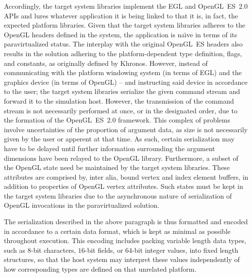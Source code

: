 Accordingly, the target system libraries implement the EGL and OpenGL~ES~$2.0$ APIs and lures whatever application it is being linked to that it is, in fact, the expected platform libraries.
Given that the target system libraries adheres to the OpenGL headers defined in the system, the application is na\"{\i}ve in terms of its paravirtualized status.
The interplay with the original OpenGL~ES headers also results in the solution adhering to the platform-dependent type definition, flags, and constants, as originally defined by Khronos.
However, instead of communicating with the platform windowing system (in terms of EGL) and the graphics device (in terms of OpenGL) -- and instructing said device in accordance to the user; the target system libraries serialize the given command stream and forward it to the simulation host.
However, the transmission of the command stream is not necessarily performed at once, or in the designated order, due to the formation of the OpenGL~ES~$2.0$ framework.
This complex of problems involve uncertainties of the proportion of argument data, as size is not necessarily given by the user or apperent at that time.
As such, certain serialization may have to be delayed until further information surrounding the argument dimensions have been relayed to the OpenGL library.
Furthermore, a subset of the OpenGL state need be maintained by the target system libraries.
These attributes are comprised by, inter alia, bound vertex and index element buffers, in addition to properties of OpenGL vertex attributes.
Such states must be kept in the target system libraries due to the asynchronous nature of serialization of OpenGL invocations in the paravirtualized solution.

The serialization described in the above paragraph is thus formatted and encoded in accordance to a certain data format, which is kept as minimal as possible throughout execution.
This encoding includes packing variable length data types, such as $8$-bit characters, $16$-bit fields, or $64$-bit integer values, into fixed length structures, so that the host system may interpret these values independently of how corresponding types are defined on that unrelated platform.


